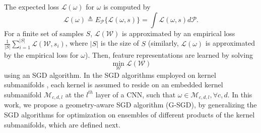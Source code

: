 \documentclass[10pt,journal,compsoc]{IEEEtran}
\theoremstyle{definition}
\theoremstyle{definition}
\theoremstyle{remark}
\theoremstyle{remark}
\theoremstyle{remark}
\begin{document}
The expected loss $\mathcal{L}(\omega)$ for $\omega$ is computed by 
\begin{equation}
\mathcal{L}(\mathcal{\omega}) \triangleq E_{\mathcal{P}} \{ {\mathcal{L}}(\mathcal{\omega},s) \} = \int {\mathcal{L}}(\mathcal{\omega},s) d \mathcal{P}.
\label{eq:expected_w_scost}
\end{equation}
 For a finite set of samples $S$,  $\mathcal{L}(\mathcal{W})$ is approximated by an empirical loss $\frac{1}{|S|} \sum_{i=1}^{|S|} \mathcal{L}(\mathcal{W},s_i)$, where $|S|$ is the size of $S$ (similarly, $\mathcal{L}(\omega)$ is approximated by the empirical loss for $\omega$). Then, feature representations are learned by solving
\begin{equation}
\min_{\mathcal{W}} \mathcal{L}(\mathcal{W})
\label{eq:opt1}
\end{equation}
using an SGD algorithm. In the SGD algorithms employed on kernel submanifolds \cite{haaai,huang162,oo16}, each kernel is assumed to reside on an embedded kernel submanifold $\mathcal{M}_{c,d,l}$ at the $l^{th}$ layer of a CNN, such that ${\omega \in \mathcal{M}_{c,d,l}}, \forall c,d$. In this work, we propose a geometry-aware SGD algorithm (G-SGD), by generalizing the SGD algorithms \cite{haaai,huang162,oo16} for optimization on ensembles of different products of the kernel submanifolds, which are defined next.
\end{document}

